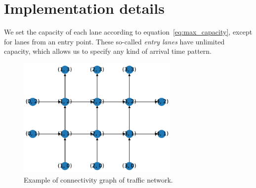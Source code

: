 \documentclass[a4paper]{article}
\theoremstyle{definition}
\theoremstyle{plain}
\begin{document}

\newpage
\section*{Implementation details}

We set the capacity of each lane according to equation~\eqref{eq:max_capacity},
except for lanes from an entry point. These so-called \textit{entry lanes} have
unlimited capacity, which allows us to specify any kind of arrival time pattern.

\begin{figure}
  \centering
  \includegraphics[width=0.7\textwidth]{figures/network_graph_example.pdf}
  \caption{Example of connectivity graph of traffic network.}
\end{figure}




\end{document}

